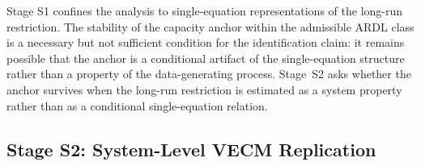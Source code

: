 \documentclass[11pt,a4paper]{article}
\begin{document}

Stage S1 confines the analysis to single-equation representations of the
long-run restriction. The stability of the capacity anchor within the
admissible ARDL class is a necessary but not sufficient condition for the
identification claim: it remains possible that the anchor is a conditional
artifact of the single-equation structure rather than a property of the
data-generating process. Stage~S2 asks whether the anchor survives when the
long-run restriction is estimated as a system property rather than as a
conditional single-equation relation.




\subsection{Stage S2: System-Level VECM Replication}
\label{sec:S2}

\end{document}
